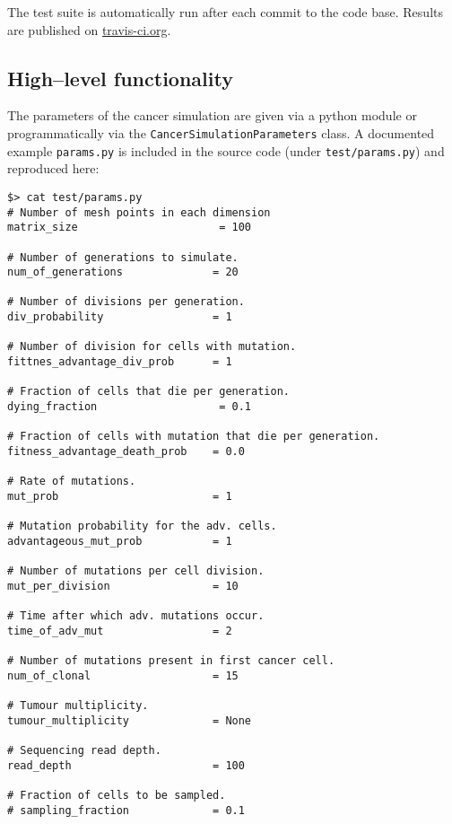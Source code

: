 \documentclass[]{article}
\begin{document}
The test suite is automatically run after each commit to the code base.
Results are published on
\href{https://travis-ci.org/mpievolbio-scicomp/cancer_sim}{travis-ci.org}.

\hypertarget{highlevel-functionality}{%
\subsection{High--level functionality}\label{highlevel-functionality}}

The parameters of the cancer simulation are given via a python module or
programmatically via the \texttt{CancerSimulationParameters} class. A
documented example \texttt{params.py} is included in the source code
(under \texttt{test/params.py}) and reproduced here:

\begin{verbatim}
$> cat test/params.py
# Number of mesh points in each dimension
matrix_size                      = 100

# Number of generations to simulate.
num_of_generations              = 20

# Number of divisions per generation.
div_probability                 = 1

# Number of division for cells with mutation.
fittnes_advantage_div_prob      = 1

# Fraction of cells that die per generation.
dying_fraction                   = 0.1

# Fraction of cells with mutation that die per generation.
fitness_advantage_death_prob    = 0.0

# Rate of mutations.
mut_prob                        = 1

# Mutation probability for the adv. cells.
advantageous_mut_prob           = 1

# Number of mutations per cell division.
mut_per_division                = 10

# Time after which adv. mutations occur.
time_of_adv_mut                 = 2

# Number of mutations present in first cancer cell.
num_of_clonal                   = 15

# Tumour multiplicity.
tumour_multiplicity             = None

# Sequencing read depth.
read_depth                      = 100

# Fraction of cells to be sampled.
# sampling_fraction             = 0.1
\end{verbatim}
\end{document}
